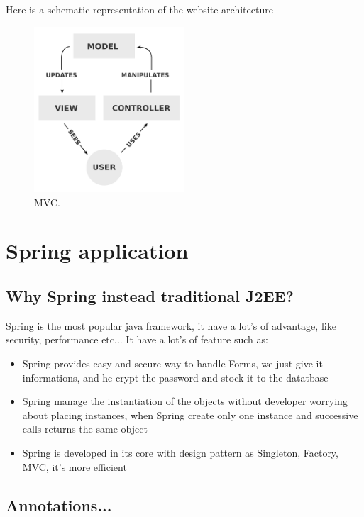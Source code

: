 Here is a schematic representation of the website architecture

\begin{figure}[!ht]
  \caption{MVC.}
  \centering
    \includegraphics[width=0.5\textwidth]{img/mvc.png}
\end{figure}


\section{Spring application}
\subsection{Why Spring instead traditional J2EE?}

Spring is the most popular java framework, it have a lot's of advantage, like security, performance etc...
It have a lot's of feature such as:

\begin{itemize}  
\item Spring provides easy and secure way to handle Forms, we just give it informations, and he crypt the password and stock it to the datatbase
\item Spring manage the instantiation of the objects without developer worrying about placing instances, when Spring create only one instance and successive calls returns the same object
\item Spring is developed in its core with design pattern as Singleton, Factory, MVC, it's more efficient
\end{itemize}  






\subsection{Annotations...}

